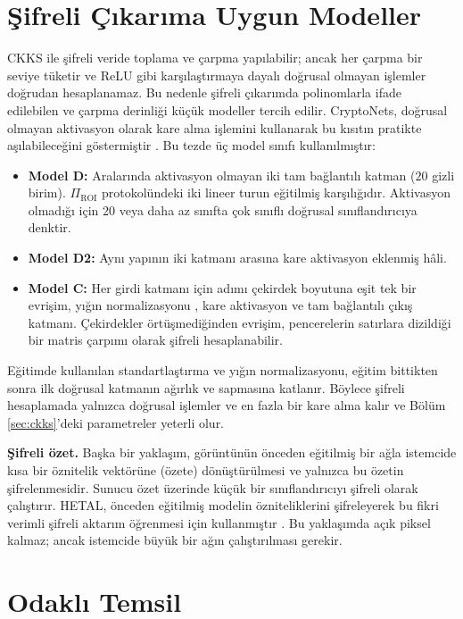 \section{Şifreli Çıkarıma Uygun Modeller}\label{sec:hemodels}

CKKS ile şifreli veride toplama ve çarpma yapılabilir; ancak her çarpma bir seviye tüketir ve ReLU gibi karşılaştırmaya dayalı doğrusal olmayan işlemler doğrudan hesaplanamaz. Bu nedenle şifreli çıkarımda polinomlarla ifade edilebilen ve çarpma derinliği küçük modeller tercih edilir. CryptoNets, doğrusal olmayan aktivasyon olarak kare alma işlemini kullanarak bu kısıtın pratikte aşılabileceğini göstermiştir \cite{giladbachrach2016cryptonets}. Bu tezde üç model sınıfı kullanılmıştır:

\begin{itemize}
\item \textbf{Model D:} Aralarında aktivasyon olmayan iki tam bağlantılı katman ($20$ gizli birim). $\Pi_{\mathrm{ROI}}$ protokolündeki iki lineer turun eğitilmiş karşılığıdır. Aktivasyon olmadığı için 20 veya daha az sınıfta çok sınıflı doğrusal sınıflandırıcıya denktir.
\item \textbf{Model D2:} Aynı yapının iki katmanı arasına kare aktivasyon eklenmiş hâli.
\item \textbf{Model C:} Her girdi katmanı için adımı çekirdek boyutuna eşit tek bir evrişim, yığın normalizasyonu \cite{ioffe2015batchnorm}, kare aktivasyon ve tam bağlantılı çıkış katmanı. Çekirdekler örtüşmediğinden evrişim, pencerelerin satırlara dizildiği bir matris çarpımı olarak şifreli hesaplanabilir.
\end{itemize}

Eğitimde kullanılan standartlaştırma ve yığın normalizasyonu, eğitim bittikten sonra ilk doğrusal katmanın ağırlık ve sapmasına katlanır. Böylece şifreli hesaplamada yalnızca doğrusal işlemler ve en fazla bir kare alma kalır ve Bölüm \ref{sec:ckks}'deki parametreler yeterli olur.

\textbf{Şifreli özet.} Başka bir yaklaşım, görüntünün önceden eğitilmiş bir ağla istemcide kısa bir öznitelik vektörüne (özete) dönüştürülmesi ve yalnızca bu özetin şifrelenmesidir. Sunucu özet üzerinde küçük bir sınıflandırıcıyı şifreli olarak çalıştırır. HETAL, önceden eğitilmiş modelin özniteliklerini şifreleyerek bu fikri verimli şifreli aktarım öğrenmesi için kullanmıştır \cite{lee2023hetal}. Bu yaklaşımda açık piksel kalmaz; ancak istemcide büyük bir ağın çalıştırılması gerekir.

\section{Odaklı Temsil}\label{sec:foveated}

